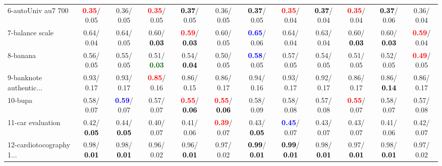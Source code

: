 \begin{table}[h]
\begin{center}
{\begin{tabular}{lc|c|c|c|c|c|c|c|c|c|c}
6-autoUniv au7 700 & \textcolor{red}{\textbf{  0.35}}/  0.05 &   0.36/  0.05 & \textcolor{red}{\textbf{  0.35}}/  0.05 & \textcolor{black}{\textbf{  0.37}}/  0.05 &   0.36/  0.05 & \textcolor{black}{\textbf{  0.37}}/  0.05 & \textcolor{red}{\textbf{  0.35}}/  0.04 & \textcolor{black}{\textbf{  0.37}}/  0.04 & \textcolor{red}{\textbf{  0.35}}/  0.04 & \textcolor{black}{\textbf{  0.37}}/  0.06 &   0.36/  0.04 \\
7-balance scale &   0.64/  0.04 &   0.64/  0.05 &   0.60/\textcolor{black}{\textbf{  0.03}} & \textcolor{red}{\textbf{  0.59}}/\textcolor{black}{\textbf{  0.03}} &   0.60/  0.05 & \textcolor{blue}{\textbf{  0.65}}/  0.06 &   0.64/  0.04 &   0.63/  0.04 &   0.60/\textcolor{black}{\textbf{  0.03}} &   0.60/\textcolor{black}{\textbf{  0.03}} & \textcolor{red}{\textbf{  0.59}}/  0.04 \\ \hline
8-banana &   0.56/  0.05 &   0.55/  0.05 &   0.51/\textcolor{darkgreen}{\textbf{  0.03}} &   0.54/\textcolor{black}{\textbf{  0.04}} &   0.50/  0.05 & \textcolor{blue}{\textbf{  0.58}}/  0.05 &   0.57/  0.05 &   0.54/  0.05 &   0.51/  0.05 &   0.52/  0.05 & \textcolor{red}{\textbf{  0.49}}/  0.05 \\
9-banknote authentic... &   0.93/  0.17 &   0.93/  0.17 & \textcolor{red}{\textbf{  0.85}}/  0.16 &   0.86/  0.15 &   0.86/  0.17 &   0.94/  0.16 &   0.93/  0.17 &   0.92/  0.17 &   0.86/  0.17 &   0.86/\textcolor{black}{\textbf{  0.14}} &   0.86/  0.17 \\
10-bupa &   0.58/  0.07 & \textcolor{blue}{\textbf{  0.59}}/  0.07 &   0.57/  0.07 & \textcolor{red}{\textbf{  0.55}}/\textcolor{black}{\textbf{  0.06}} & \textcolor{red}{\textbf{  0.55}}/\textcolor{black}{\textbf{  0.06}} &   0.58/  0.09 &   0.58/  0.08 &   0.57/  0.08 & \textcolor{red}{\textbf{  0.55}}/  0.07 &   0.58/  0.07 &   0.57/  0.08 \\
11-car evaluation &   0.42/\textcolor{black}{\textbf{  0.05}} &   0.44/\textcolor{black}{\textbf{  0.05}} &   0.40/  0.07 &   0.41/  0.06 & \textcolor{red}{\textbf{  0.39}}/  0.07 &   0.43/\textcolor{black}{\textbf{  0.05}} & \textcolor{blue}{\textbf{  0.45}}/  0.07 &   0.43/  0.07 &   0.43/  0.07 &   0.41/  0.06 &   0.42/  0.07 \\
12-cardiotocography 1... &   0.98/\textcolor{black}{\textbf{  0.01}} &   0.98/\textcolor{black}{\textbf{  0.01}} &   0.96/  0.02 &   0.96/\textcolor{black}{\textbf{  0.01}} &   0.97/  0.02 & \textcolor{black}{\textbf{  0.99}}/\textcolor{black}{\textbf{  0.01}} & \textcolor{black}{\textbf{  0.99}}/\textcolor{black}{\textbf{  0.01}} &   0.98/\textcolor{black}{\textbf{  0.01}} &   0.97/\textcolor{black}{\textbf{  0.01}} &   0.98/\textcolor{black}{\textbf{  0.01}} &   0.97/  0.02 \\

\end{tabular}}
\end{center}
\end{table}
